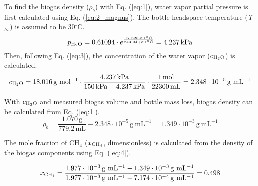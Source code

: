 \documentclass[]{article}
\newcommand{\unit}[1]{\ensuremath{\, \mathrm{#1}}}
\begin{document}
To find the biogas density ($\rho_b$) with Eq. (\ref{eq:1}), water vapor partial pressure is first calculated using Eq. (\ref{eq:2_magnus}). 
The bottle headspace temperature (\textit{T}$_{hs}$) is assumed to be 30$^\circ$C.
\begin{equation*}
  p\textsubscript{H$_2$O} = 0.61094 \cdot e^{\frac{17.625 \cdot 30\unit{^\circ C}}{243.04 + 30 \unit{^\circ C}}} = 4.237 \unit{kPa}
\end{equation*}
Then, following Eq. (\ref{eq:3}), the concentration of the water vapor ($c\textsubscript{H$_2$O}$) is calculated.
\begin{equation*}
  c\textsubscript{H$_2$O} = 18.016 \unit{g~mol^{-1}} \cdot \frac{4.237 \unit{kPa}}{150 \unit{kPa} - 4.237 \unit{kPa}} \cdot \frac{1 \unit{mol}}{22300 \unit{mL}} = 2.348\cdot10^{-5} \unit{g~mL^{-1}}
\end{equation*}

With $c\textsubscript{H$_2$O}$ and measured biogas volume and bottle mass loss, biogas density can be calculated from Eq. (\ref{eq:1}).
\begin{equation*}
  \rho_b=\frac{1.070 \unit{g}}{779.2 \unit{mL}} - 2.348 \cdot 10^{-5} \unit{g~mL^{-1}} = 1.349 \cdot 10^{-3} \unit{g~mL^{-1}}
\end{equation*}

The mole fraction of CH$_4$ ($x\textsubscript{CH$_4$}$, dimensionless) is calculated from the density of the biogas components using Eq. (\ref{eq:4}). 

\begin{equation*}
  x\textsubscript{CH$_4$}=\frac{1.977  \cdot 10^{-3} \unit{g~mL^{-1}} - 1.349 \cdot 10^{-3} \unit{g~mL^{-1}}}
  {1.977  \cdot 10^{-3} \unit{g~mL^{-1}} - 7.174 \cdot 10^{-4} \unit{g~mL^{-1}}}
  = 0.498
\end{equation*}


\end{document}
